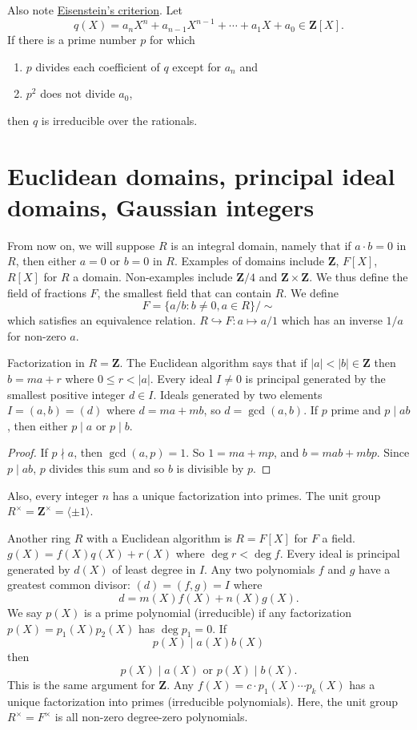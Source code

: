 \documentclass[11pt, oneside]{amsart}
\numberwithin{equation}{section}
\numberwithin{theorem}{section}
\theoremstyle{definition}
\def\Z{\mathbf{Z}}
\begin{document}
{Also note \href{https://en.wikipedia.org/wiki/Eisenstein\%27s_criterion}{Eisenstein's criterion}. Let 
$$
q(X) = a_nX^n + a_{n-1}X^{n-1} + \cdots + a_1X + a_0 \in \Z[X].
$$
If there is a prime number $p$ for which
\begin{enumerate}[label=(\roman*)]
\item $p$ divides each coefficient of $q$ except for $a_n$ and
\item $p^2$ does not divide $a_0$,
\end{enumerate}
then $q$ is irreducible over the rationals.

\section{Euclidean domains, principal ideal domains, Gaussian integers}
From now on, we will suppose $R$ is an integral domain, namely that if $a\cdot b=0$ in $R$, then either $a=0$ or $b=0$ in $R$. Examples of domains include $\Z$, $F[X]$, $R[X]$ for $R$ a domain. Non-examples include $\Z/4$ and $\Z\times \Z$. We thus define the field of fractions $F$, the smallest field that can contain $R$. We define 
$$
F = \{ a/b : b\neq 0, a\in R  \}/\sim
$$
which satisfies an equivalence relation. $R\hookrightarrow F : a\mapsto a/1$ which has an inverse $1/a$ for non-zero $a$. 

Factorization in $R=\Z$. The Euclidean algorithm says that if $|a| < |b| \in \Z$ then $b = ma + r$ where $0\leqslant r < |a|$. Every ideal $I\neq 0$ is principal generated by the smallest positive integer $d\in I$. Ideals generated by two elements $I = (a,b) = (d)$ where $d = ma + mb$, so $d = \gcd(a,b)$. If $p$ prime and $p\mid ab$, then either $p\mid a$ or $p\mid b$.
\begin{proof}
If $p\nmid a$, then $\gcd(a,p)=1$. So $1=ma+mp$, and $b = mab +mbp$. Since $p\mid ab$, $p$ divides this sum and so $b$ is divisible by $p$.
\end{proof}
Also, every integer $n$ has a unique factorization into primes.  The unit group $R^\times = \Z^\times =\langle \pm 1\rangle$.

Another ring $R$ with a Euclidean algorithm is $R=F[X]$ for $F$ a field. $g(X) = f(X) q(X) +r(X)$ where $\deg r < \deg f$. Every ideal is principal generated by $d(X)$ of least degree in $I$. Any two polynomials $f$ and $g$ have a greatest common divisor: $(d) = (f,g) = I$ where 
$$
d = m(X)f(X) + n(X)g(X).
$$ 
We say $p(X)$ is a prime polynomial (irreducible) if any factorization $p(X) = p_1(X)p_2(X)$ has $\deg p_1  = 0$. If 
$$
p(X) \mid a(X)b(X)
$$
then
$$
p(X) \mid a(X) \textrm{ or } p(X) \mid b(X).
$$
This is the same argument for $\Z$. Any $f(X) = c \cdot p_1(X)\cdots p_k(X)$ has a unique factorization into primes (irreducible polynomials). Here, the unit group $R^\times = F^\times $ is all non-zero degree-zero polynomials.

}
\end{document}
